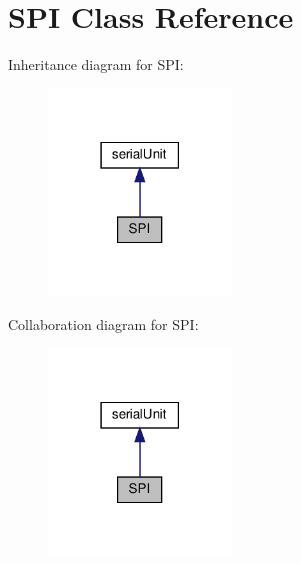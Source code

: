 \hypertarget{classSPI}{}\section{S\+PI Class Reference}
\label{classSPI}


Inheritance diagram for S\+PI\+:\nopagebreak
\begin{figure}[H]
\begin{center}
\leavevmode
\includegraphics[width=138pt]{classSPI__inherit__graph}
\end{center}
\end{figure}


Collaboration diagram for S\+PI\+:\nopagebreak
\begin{figure}[H]
\begin{center}
\leavevmode
\includegraphics[width=138pt]{classSPI__coll__graph}
\end{center}
\end{figure}
